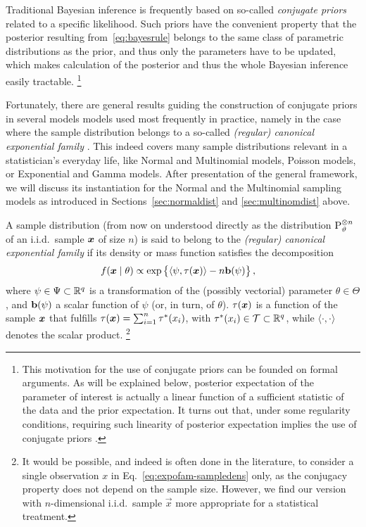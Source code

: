 Traditional Bayesian inference is frequently based on so-called \emph{conjugate priors} related to a specific likelihood.
Such priors have the convenient property that the posterior resulting from~\eqref{eq:bayesrule}
belongs to the same class of parametric distributions as the prior, and thus only the parameters have to be updated,
which makes calculation of the posterior and thus the whole Bayesian inference easily tractable.%
\footnote{This motivation for the use of conjugate priors can be founded on formal arguments.
As will be explained below, posterior expectation of the parameter of interest
is actually a linear function of a sufficient statistic of the data and the prior expectation.
It turns out that, under some regularity conditions, requiring such linearity of posterior expectation
implies the use of conjugate priors \parencite[p.~276]{2000:bernardosmith}.}

Fortunately, there are general results guiding the construction of conjugate priors in several models models used most frequently in practice,
namely in the case where the sample distribution belongs to a so-called \emph{(regular) canonical exponential family}
\parencite[e.g.,][pp.~202 and 272f]{2000:bernardosmith}. %
This indeed covers many sample distributions relevant in a statistician's everyday life,
like Normal and Multinomial models, Poisson models, or Exponential and Gamma models.
After presentation of the general framework, we will discuss its instantiation for the Normal
and the Multinomial sampling models as introduced in Sections~\ref{sec:normaldist} and \ref{sec:multinomdist} above.

A sample distribution
(from now on understood directly as the distribution $\operatorname{P}_\vartheta^{\otimes n}$ of an i.i.d.\ sample ${\bm x}$ of size $n$)
is said to belong to the \emph{(regular) canonical exponential family} if its density or mass function satisfies the decomposition
\begin{align}
\label{eq:expofam-sampledens}
f({\bm x} \mid \theta) &\propto \exp\big\{\langle \psi, \tau({\bm x}) \rangle - n \mathbf{b}(\psi)\big\}\,,
\end{align}
where $\psi \in \Psi \subset \mathbb{R}^q$ is a transformation of the (possibly vectorial) parameter $\theta \in \Theta$,
and $\mathbf{b}(\psi)$ a scalar function of $\psi$ (or, in turn, of $\theta$).
$\tau({\bm x})$ is a function of the sample ${\bm x}$ that fulfills $\tau({\bm x}) = \sum_{i=1}^n \tau^*(x_i)$,
with $\tau^*(x_i) \in \mathcal{T} \subset \mathbb{R}^q$,
while $\langle\cdot, \cdot\rangle$ denotes the scalar product.%
\footnote{\label{foot:dataisplural}It would be possible, and indeed is often done in the literature,
to consider a single observation $x$ in Eq.~\eqref{eq:expofam-sampledens} only,
as the conjugacy property does not depend on the sample size.
However, we find our version with $n$-dimensional i.i.d.\ sample $\vec{x}$
more appropriate for a statistical treatment.} %


